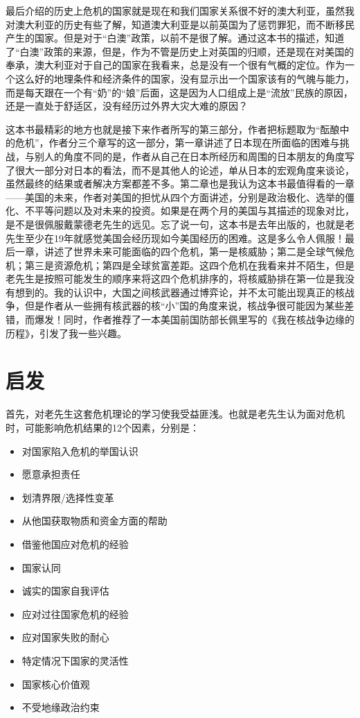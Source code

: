 \documentclass{article}
\begin{document}
    最后介绍的历史上危机的国家就是现在和我们国家关系很不好的澳大利亚，虽然我对澳大利亚的历史有些了解，知道澳大利亚是以前英国为了惩罚罪犯，而不断移民产生的国家。但是对于“白澳”政策，以前不是很了解。通过这本书的描述，知道了“白澳”政策的来源，但是，作为不管是历史上对英国的归顺，还是现在对美国的奉承，澳大利亚对于自己的国家在我看来，总是没有一个很有气概的定位。作为一个这么好的地理条件和经济条件的国家，没有显示出一个国家该有的气魄与能力，而是每天跟在一个有“奶”的“娘”后面，这是因为人口组成上是“流放”民族的原因，还是一直处于舒适区，没有经历过外界大灾大难的原因？

    这本书最精彩的地方也就是接下来作者所写的第三部分，作者把标题取为“酝酿中的危机”，作者分三个章写的这一部分，第一章讲述了日本现在所面临的困难与挑战，与别人的角度不同的是，作者从自己在日本所经历和周围的日本朋友的角度写了很大一部分对日本的看法，而不是其他人的论述，单从日本的宏观角度来谈论，虽然最终的结果或者解决方案都差不多。第二章也是我认为这本书最值得看的一章——美国的未来，作者对美国的担忧从四个方面讲述，分别是政治极化、选举的僵化、不平等问题以及对未来的投资。如果是在两个月的美国与其描述的现象对比，是不是很佩服戴蒙德老先生的远见。忘了说一句，这本书是去年出版的，也就是老先生至少在19年就感觉美国会经历现如今美国经历的困难。这是多么令人佩服！最后一章，讲述了世界未来可能面临的四个危机，第一是核威胁；第二是全球气候危机；第三是资源危机；第四是全球贫富差距。这四个危机在我看来并不陌生，但是老先生是按照可能发生的顺序来将这四个危机排序的，将核威胁排在第一位是我没有想到的。我的认识中，大国之间核武器通过博弈论，并不太可能出现真正的核战争，但是作者从一些拥有核武器的核“小”国的角度来说，核战争很可能因为某些差错，而爆发！同时，作者推荐了一本美国前国防部长佩里写的《我在核战争边缘的历程》，引发了我一些兴趣。

    \newpage

    \section{启发}
    首先，对老先生这套危机理论的学习使我受益匪浅。也就是老先生认为面对危机时，可能影响危机结果的12个因素，分别是：
    \begin{itemize}
        \item 对国家陷入危机的举国认识
        \item 愿意承担责任
        \item 划清界限/选择性变革
        \item 从他国获取物质和资金方面的帮助
        \item 借鉴他国应对危机的经验
        \item 国家认同
        \item 诚实的国家自我评估
        \item 应对过往国家危机的经验
        \item 应对国家失败的耐心
        \item 特定情况下国家的灵活性
        \item 国家核心价值观
        \item 不受地缘政治约束
    \end{itemize}
    
\end{document}
